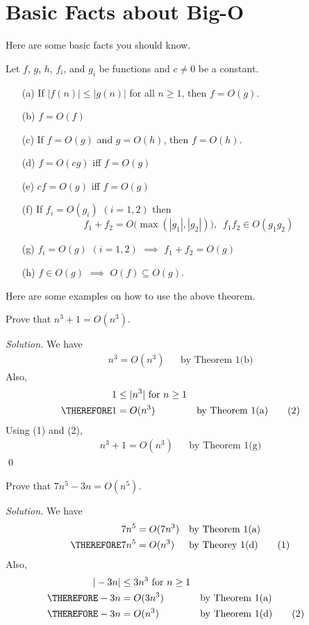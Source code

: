 \section{Basic Facts about Big-O}

Here are some basic facts you should know. 

\begin{thm}
Let $f$, $g$, $h$, $f_i$, and $g_i$ be functions 
and $c \neq 0$ be a constant.
\begin{enumerate}
 \item[(a)] If $|f(n)| \leq |g(n)|$ for all $n \geq 1$, then $f = O(g)$.
 \item[(b)] $f = O(f)$
 \item[(c)] If $f = O(g)$ and $g = O(h)$, then $f = O(h)$.
 \item[(d)] $f = O(cg)$ iff $f = O(g)$
 \item[(e)] $cf = O(g)$ iff $f = O(g)$
 \item[(f)] If $f_i = O(g_i)$ $(i=1,2)$ then
 \[
  f_1+f_2 = O \bigl( \max(|g_1|,|g_2|) \bigr), \,\,\, f_1 f_2 \in O(g_1 g_2)
 \]
 \item[(g)] $f_i = O(g)$ $(i=1,2)$ $\implies$ $f_1+f_2 = O(g)$
 \item[(h)] $f \in O(g)$ $\implies$ $O(f) \subseteq O(g)$.
\end{enumerate}
\end{thm}

Here are some examples on how to use the above theorem.

\begin{eg}
Prove that $n^3 + 1 = O(n^3)$.
\end{eg}

\textit{Solution.}
We have
\begin{align*}
n^3 = O(n^3) & & \text{by Theorem 1(b)} \tag{1}
\end{align*}
Also, 
\begin{align*}
           1 &\leq |n^3| \text{ for $n \geq 1$} \\
\THEREFORE 1 &= O(n^3) & \text{by Theorem 1(a)} \tag{2}
\end{align*}
Using (1) and (2),
\begin{align*}
n^3 + 1 = O(n^3) & & \text{by Theorem 1(g)}
\end{align*}
\qed


\begin{eg}
Prove that $7n^5 - 3n = O(n^5)$.
\end{eg}

\textit{Solution.}
We have
\begin{align*}
           7n^5 &= O(7n^3) & & \text{by Theorem 1(a)}  \\
\THEREFORE 7n^5 &= O(n^3) & & \text{by Theorey 1(d)} \tag{1}
\end{align*}
Also, 
\begin{align*}
|-3n| &\leq 3n^3 \text{ for $n \geq 1$} \\ 
\THEREFORE -3n &= O(3n^3)  & & \text{by Theorem 1(a)}  \\
\THEREFORE -3n &= O(n^3)   & & \text{by Theorem 1(d)} \tag{2}
\end{align*}

